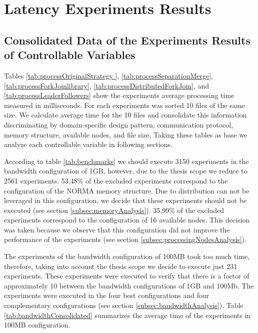 \section{Latency Experiments Results}

\subsection{Consolidated Data of the Experiments Results of Controllable Variables}
\label{sebsec:consolidatedData}

Tables \ref{tab:processOriginalStrategy }, \ref{tab:processSeparationMerge}, \ref{tab:processForkJoinlibrary}, \ref{tab:processDistributedForkJoin}, and \ref{tab:processLeaderFollowers} show the experiments average processing time measured in milliseconds. For each experiments was sorted 10 files of the same size. We calculate average time for the 10 files and consolidate this information discriminating by domain-specific design pattern, communication protocol, memory structure, available nodes, and file size. Taking these tables as base we analyze each controllable variable in following sections.

According to table \ref{tab:benchmarks} we should execute 3150 experiments in the bandwidth configuration of 1GB, however, due to the thesis scope we reduce to 2561 experiments. 53,48\% of the excluded experiments correspond to the configuration of the NORMA memory structure. Due to distribution can not be leveraged in this configuration, we decide that these experiments should not be executed (see section \ref{subsec:memoryAnalysis}). 35,99\% of the excluded experiments correspond to the configuration of 16 available nodes. This decision was taken because we observe that this configuration did not improve the performance of the experiments (see section \ref{subsec:processingNodesAnalysis}).

The experiments of the bandwidth configuration of 100MB took too much time, therefore, taking into account the thesis scope we decide to execute just 231 experiments. These experiments were executed to verify that there is a factor of approximately 10 between the bandwidth configurations of 1GB and 100Mb. The experiments were executed in the four best configurations and four complementary configurations (see section \ref{subsec:bandwidthAnalysis}). Table \ref{tab:bandwidthConsolidated} summarizes the average time of the experiments in 100MB configuration.

